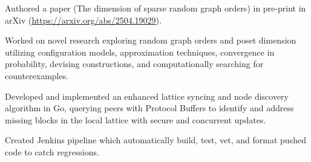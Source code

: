 \begin{resumeItem}
\begin{resumeList}
    \item Authored a paper (The dimension of sparse random graph orders) in pre-print in arXiv (\href{https://arxiv.org/abs/2504.19029}{https://arxiv.org/abs/2504.19029}).
    \item Worked on novel research exploring random graph orders and poset dimension utilizing configuration models, approximation techniques, convergence in probability, devising constructions, and computationally searching for counterexamples. 
\end{resumeList}
\end{resumeItem}

\begin{resumeItem}
\begin{resumeList}
    \item Developed and implemented an enhanced lattice syncing and node discovery algorithm in Go, querying peers with Protocol Buffers to identify and address missing blocks in the local lattice with secure and concurrent updates.
    \item Created Jenkins pipeline which automatically build, test, vet, and format pushed code to catch regressions.
\end{resumeList}
\end{resumeItem}

